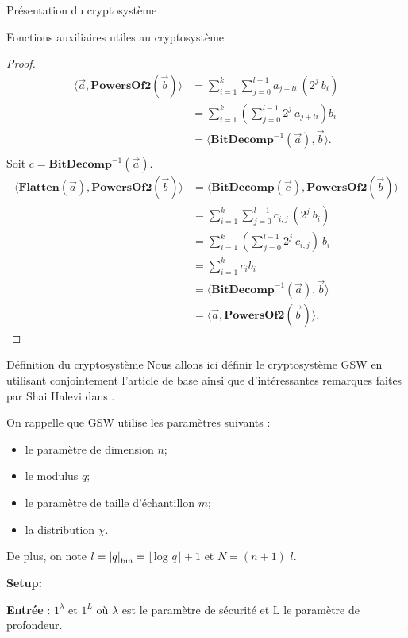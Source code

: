 \begin{section}{Présentation du cryptosystème}
\begin{subsection}{Fonctions auxiliaires utiles au cryptosystème}
	\begin{proof}
	\begin{align*}
	\langle \vec{a}, \textbf{PowersOf2}(\vec{b}) \rangle &= \sum\limits_{i=1}^{k} \sum\limits_{j=0}^{l-1} a_{j+li}
	\: (2^{j} \: b_i) \\
	&= \sum\limits_{i=1}^{k} \left(\sum\limits_{j=0}^{l-1} 2^j\: a_{j+li} \right) b_i \\
	&= \langle \textbf{BitDecomp}^{-1}(\vec{a}), \vec{b}\rangle. \\
	\end{align*}
	Soit $c = \textbf{BitDecomp}^{-1}(\vec{a})$.
	\begin{align*}
	\langle \textbf{Flatten}(\vec{a}),\textbf{PowersOf2}(\vec{b}) \rangle &= \langle \textbf{BitDecomp}(\vec{c}),\textbf{PowersOf2}(\vec{b}) \rangle \\
	&= \sum\limits_{i=1}^{k} \sum\limits_{j=0}^{l-1} c_{i,j}\: (2^{j}\: b_i) \\
	&= \sum\limits_{i=1}^{k} \left(\sum\limits_{j=0}^{l-1} 2^j \: c_{i,j}\right)\: b_i \\
	&= \sum\limits_{i=1}^{k}  c_i b_i \\
	&= \langle \textbf{BitDecomp}^{-1}(\vec{a}), \vec{b}\rangle \\
	&= \langle \vec{a}, \textbf{PowersOf2}(\vec{b}) \rangle.
	\end{align*}
	\end{proof}
	
	\end{subsection}
	\begin{subsection}{Définition du cryptosystème}
	Nous allons ici définir le cryptosystème GSW en utilisant conjointement l'article de base \cite{EPRINT:GenSahWat13} ainsi que d'intéressantes remarques faites par Shai Halevi dans \cite{halevi}.

	On rappelle que GSW utilise les paramètres suivants : 
\begin{itemize}
\item le paramètre de dimension $n$;
\item le modulus $q$;
\item le paramètre de taille d'échantillon $m$;
\item la distribution $\chi$.
\end{itemize}
De plus, on note $l = {|q|}_{\text{bin}} = \lfloor$log $q\rfloor + 1$ et $N = (n + 1)$ $l$.


\vspace{0.5cm}\noindent\textbf{Setup:}
\flushleft

	\textbf{Entrée} : $1^\lambda$ et $1^L$ où $\lambda$ est le paramètre de sécurité et L le paramètre de profondeur.


\end{subsection}
\end{section}
